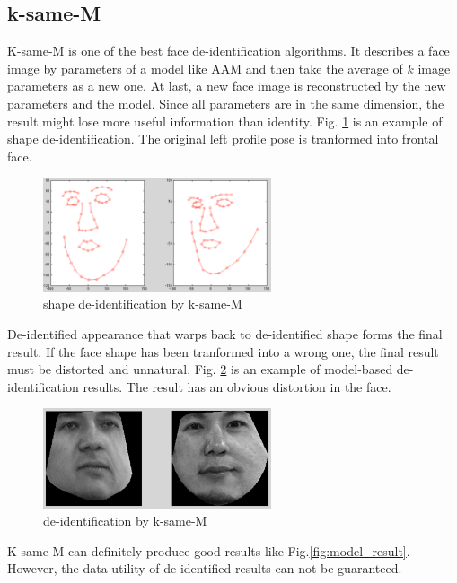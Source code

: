 	\subsection{k-same-M}
	K-same-M is one of the best face de-identification algorithms. It describes a face image by parameters of a model like AAM and then take the average of $k$ image parameters as a new one. At last, a new face image is reconstructed by the new parameters and the model. Since all parameters are in the same dimension, the result might lose more useful information than identity. Fig. \ref{fig:shape_k_s} is an example of shape de-identification. The original left profile pose is tranformed into frontal face. 

	\begin{figure}[!htb]
	  \centering
	  \includegraphics[width=0.6\textwidth]{figure/model_shape_1}
	  \caption{shape de-identification by k-same-M}
	  \label{fig:shape_k_s}
	\end{figure}

	De-identified appearance that warps back to de-identified shape forms the final result. If the face shape has been tranformed into a wrong one, the final result must be distorted and unnatural. Fig. \ref{fig:MkS} is an example of model-based de-identification results. The result has an obvious distortion in the face. 

	\begin{figure}[!htb]
	  \centering
	  \includegraphics[width=0.6\textwidth]{figure/model_result}
	  \caption{de-identification by k-same-M}
	  \label{fig:MkS}
	\end{figure}

	K-same-M can definitely produce good results like Fig.\ref{fig:model_result}. However, the data utility of de-identified results can not be guaranteed. 


